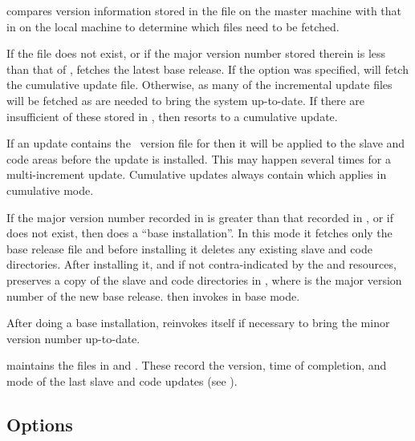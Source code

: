 \noindent
{} compares version information stored in the
 file on the master machine with that in
 on the local machine to determine which files need
to be fetched.

If the  file does not exist, or if the major version
number stored therein is less than that of ,
 fetches the latest base release.  If the  option was
specified,  will fetch the cumulative update file.  Otherwise, as
many of the incremental update files will be fetched as are needed to bring
the system up-to-date.  If there are insufficient of these stored in
, then  resorts to a cumulative update.

If an update contains the \rcs\ version file for 
then it will be applied to the slave and code areas before the update is
installed.  This may happen several times for a multi-increment update.
Cumulative updates always contain  which
 applies in cumulative mode.

If the major version number recorded in  is greater
than that recorded in , or if
 does not exist, then  does a ``base
installation''.  In this mode it fetches only the base release file and before
installing it deletes any existing slave and code directories.  After
installing it, and if not contra-indicated by the
 and 
resources,  preserves a copy of the slave and code directories in
, where  is the major version number of
the new base release.   then invokes  in base mode.

After doing a base installation,  reinvokes itself if necessary to
bring the minor version number up-to-date.

 maintains the  files in  and
.  These record the version, time of completion, and mode of
the last slave and code updates (see ).

\subsection*{Options}

